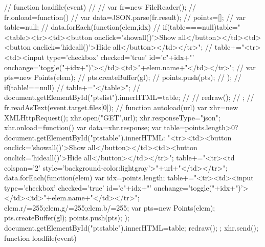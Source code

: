 //            function loadfile(event)
//            {
//                var fr=new FileReader();
//                fr.onload=function(){
//                    var data=JSON.parse(fr.result);
//                    points=[];
//                    var table=null;
//                    data.forEach(function(elem,idx){
//                        if(table===null)table="<table><tr><td><button onclick='showall()'>Show all</button></td><td><button onclick='hideall()'>Hide all</button></td></tr>";
//                        table+="<tr><td><input type='checkbox' checked='true' id='c"+idx+"' onchange='toggle("+idx+")'></td><td>"+elem.name+"</td></tr>";
//                        var pts=new Points(elem);
//                        pts.createBuffer(gl);
//                        points.push(pts);
//                    });
//                    if(table!==null){
//                        table+="</table>";
//                        document.getElementById("ptslist").innerHTML=table;
//                    }
//                    redraw();
//                };
//                fr.readAsText(event.target.files[0]);
//            }
            function autoload(url){
                var xhr=new XMLHttpRequest();
                xhr.open("GET",url);
                xhr.responseType="json";
                xhr.onload=function(){
                    var data=xhr.response;
                    var table=points.length>0?document.getElementById("ptstable").innerHTML:
                            "<tr><td><button onclick='showall()'>Show all</button></td><td><button onclick='hideall()'>Hide all</button></td></tr>";
                    table+="<tr><td colspan='2' style='background-color:lightgray'>"+url+"</td></tr>";
                    data.forEach(function(elem){
                        var idx=points.length;
                        table+="<tr><td><input type='checkbox' checked='true' id='c"+idx+"' onchange='toggle("+idx+")'></td><td>"+elem.name+"</td></tr>";
                        elem.r/=255;elem.g/=255;elem.b/=255;
                        var pts=new Points(elem);
                        pts.createBuffer(gl);
                        points.push(pts);
                    });
                    document.getElementById("ptstable").innerHTML=table;
                    redraw();
                };
                xhr.send();
            }
            function loadfile(event)
